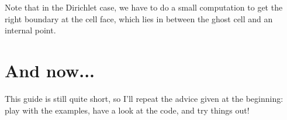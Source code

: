 \documentclass[a4paper, a4wide]{article}
\begin{document}
Note that in the Dirichlet case, we have to do a small computation to get the
right boundary at the cell face, which lies in between the ghost cell and an
internal point.

\section{And now...}

This guide is still quite short, so I'll repeat the advice given at the
beginning: play with the examples, have a look at the code, and try things out!
\end{document}
